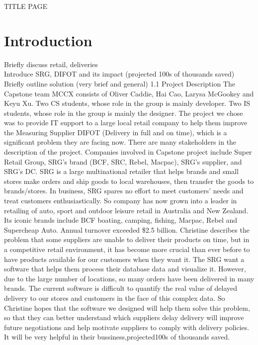 \documentclass[paper=a4]{article}
\begin{document}
TITLE PAGE

\pagebreak

\tableofcontents

\pagebreak
\section{Introduction}
Briefly discuss retail, deliveries \\
Introduce SRG, DIFOT and its impact (projected 100s of thousands saved) \\
Briefly outline solution (very brief and general)
1.1	Project Description
The Capstone team MCCX consists of Oliver Caddie, Hai Cao, Larysa McGookey and Keyu Xu. Two CS students, whose role in the group is mainly developer. Two IS students, whose role in the group is mainly the designer. The project we chose was to provide IT support to a large local retail company to help them improve the Measuring Supplier DIFOT (Delivery in full and on time), which is a significant problem they are facing now. 
There are many stakeholders in the description of the project. Companies involved in Capstone project include Super Retail Group, SRG's brand (BCF, SRC, Rebel, Macpac), SRG's supplier, and SRG’s DC. SRG is a large multinational retailer that helps brands and small stores make orders and ship goods to local warehouses, then transfer the goods to brands/stores. In business, SRG spares no effort to meet customers' needs and treat customers enthusiastically. So company has now grown into a leader in retailing of auto, sport and outdoor leisure retail in Australia and New Zealand. Its iconic brands include BCF boating, camping, fishing, Macpac, Rebel and Supercheap Auto. Annual turnover exceeded \$2.5 billion.
Christine describes the problem that some suppliers are unable to deliver their products on time, but in a competitive retail environment, it has become more crucial than ever before to have products available for our customers when they want it. The SRG want a software that helps them process their database data and visualize it. However, due to the large number of locations, so many orders have been delivered in many brands. The current software is difficult to quantify the real value of delayed delivery to our stores and customers in the face of this complex data. So Christine hopes that the software we designed will help them solve this problem, so that they can better understand which suppliers delay delivery will improve future negotiations and help motivate suppliers to comply with delivery policies. It will be very helpful in their bussiness,projected100s of thousands saved.
\end{document}
